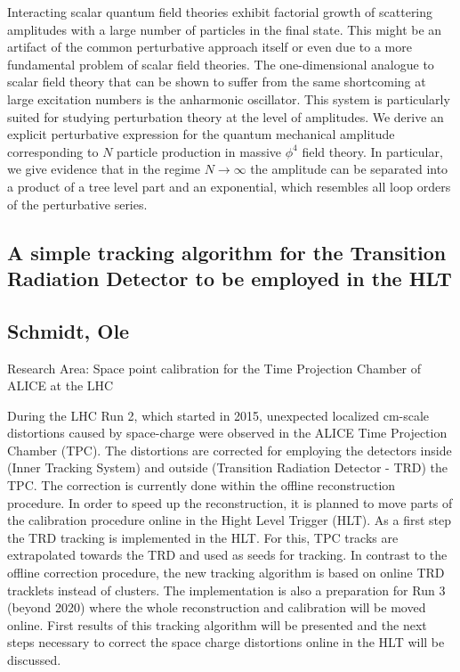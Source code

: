 \noindent Interacting scalar quantum field theories exhibit factorial growth of scattering amplitudes with a large number of particles in the final state.
This might be an artifact of the common perturbative approach itself or even due to a more fundamental problem of scalar field theories.
\newline The one-dimensional analogue to scalar field theory that can be shown to suffer from the same shortcoming at large excitation numbers is the anharmonic oscillator.
This system is particularly suited for studying perturbation theory at the level of amplitudes.
We derive an explicit perturbative expression for the quantum mechanical amplitude corresponding to $N$ particle production in massive $\phi^4$ field theory.
In particular, we give evidence that in the regime $N \rightarrow \infty$ the amplitude can be separated into a product of a tree level part and an exponential, which resembles all loop orders of the perturbative series.

\subsection*{\centering \large A simple tracking algorithm for the Transition Radiation Detector to be employed in the HLT}
\subsection*{\centering \normalsize Schmidt, Ole}
Research Area: Space point calibration for the Time Projection Chamber of ALICE at the LHC \newline

\noindent During the LHC Run 2, which started in 2015, unexpected localized cm-scale distortions caused by space-charge were observed in the ALICE Time Projection Chamber (TPC). The distortions are corrected for employing the detectors inside (Inner Tracking System) and outside (Transition Radiation Detector - TRD) the TPC. The correction is currently done within the offline reconstruction procedure.
\newline
In order to speed up the reconstruction, it is planned to move parts of the calibration procedure online in the Hight Level Trigger (HLT). As a first step the TRD tracking is implemented in the HLT. For this, TPC tracks are extrapolated towards the TRD and used as seeds for tracking. In contrast to the offline correction procedure, the new tracking algorithm is based on online TRD tracklets instead of clusters. The implementation is also a preparation for Run 3 (beyond 2020) where the whole reconstruction and calibration will be moved online. First results of this tracking algorithm will be presented and the next steps necessary to correct the space charge distortions online in the HLT will be discussed. 
\newpage
